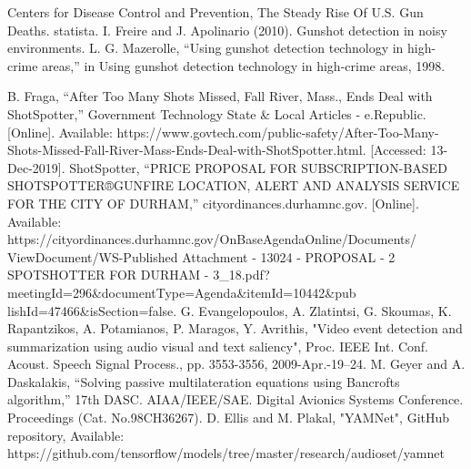 \documentclass[conference]{IEEEtran}
\begin{document}
\begin{thebibliography}{00}
 Centers for Disease Control and Prevention, The Steady Rise Of U.S. Gun Deaths. statista.
 I. Freire and J. Apolinario (2010). Gunshot detection in noisy environments.
 L. G. Mazerolle, “Using gunshot detection technology in high-crime areas,” in Using gunshot detection technology in high-crime areas, 1998.


 B. Fraga, “After Too Many Shots Missed, Fall River, Mass., Ends Deal with ShotSpotter,” Government Technology State \& Local Articles - e.Republic. [Online]. Available: https://www.govtech.com/public-safety/After-Too-Many-Shots-Missed-Fall-River-Mass-Ends-Deal-with-ShotSpotter.html. [Accessed: 13-Dec-2019].
ShotSpotter, “PRICE PROPOSAL FOR SUBSCRIPTION-BASED SHOTSPOTTER®GUNFIRE LOCATION, ALERT AND ANALYSIS SERVICE FOR THE CITY OF DURHAM,” cityordinances.durhamnc.gov. [Online]. Available: https://cityordinances.durhamnc.gov/OnBaseAgendaOnline/Documents/
ViewDocument/WS-Published Attachment - 13024 - PROPOSAL - 2 SPOTSHOTTER FOR DURHAM - 3\_18.pdf?meetingId=296\&documentType=Agenda\&itemId=10442\&pub
lishId=47466\&isSection=false.
  G. Evangelopoulos, A. Zlatintsi, G. Skoumas, K. Rapantzikos, A. Potamianos, P. Maragos, Y. Avrithis, "Video event detection and summarization using audio visual and text saliency", Proc. IEEE Int. Conf. Acoust. Speech Signal Process., pp. 3553-3556, 2009-Apr.-19–24.
 M. Geyer and A. Daskalakis, “Solving passive multilateration equations using Bancrofts algorithm,” 17th DASC. AIAA/IEEE/SAE. Digital Avionics Systems Conference. Proceedings (Cat. No.98CH36267).
 D. Ellis and M. Plakal, "YAMNet", GitHub repository, Available: https://github.com/tensorflow/models/tree/master/research/audioset/yamnet



\end{thebibliography}
\end{document}
